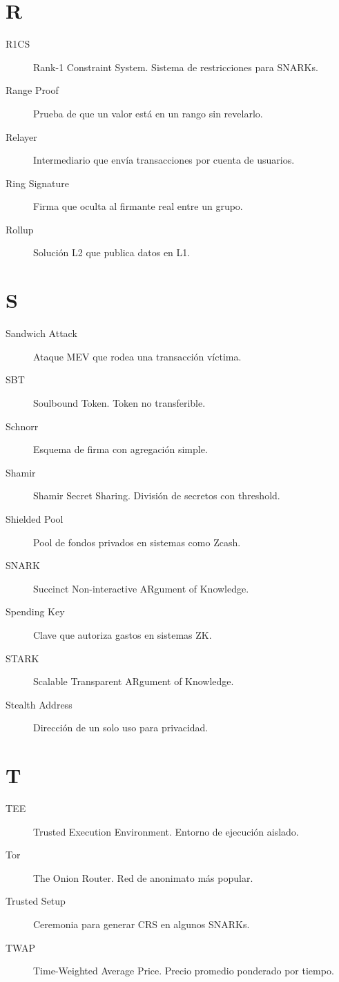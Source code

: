 \documentclass[11pt,a4paper,twoside]{book}
\theoremstyle{definition}
\theoremstyle{remark}
\begin{document}
\section*{R}
\begin{description}
\item[R1CS] Rank-1 Constraint System. Sistema de restricciones para SNARKs.
\item[Range Proof] Prueba de que un valor está en un rango sin revelarlo.
\item[Relayer] Intermediario que envía transacciones por cuenta de usuarios.
\item[Ring Signature] Firma que oculta al firmante real entre un grupo.
\item[Rollup] Solución L2 que publica datos en L1.
\end{description}

\section*{S}
\begin{description}
\item[Sandwich Attack] Ataque MEV que rodea una transacción víctima.
\item[SBT] Soulbound Token. Token no transferible.
\item[Schnorr] Esquema de firma con agregación simple.
\item[Shamir] Shamir Secret Sharing. División de secretos con threshold.
\item[Shielded Pool] Pool de fondos privados en sistemas como Zcash.
\item[SNARK] Succinct Non-interactive ARgument of Knowledge.
\item[Spending Key] Clave que autoriza gastos en sistemas ZK.
\item[STARK] Scalable Transparent ARgument of Knowledge.
\item[Stealth Address] Dirección de un solo uso para privacidad.
\end{description}

\section*{T}
\begin{description}
\item[TEE] Trusted Execution Environment. Entorno de ejecución aislado.
\item[Tor] The Onion Router. Red de anonimato más popular.
\item[Trusted Setup] Ceremonia para generar CRS en algunos SNARKs.
\item[TWAP] Time-Weighted Average Price. Precio promedio ponderado por tiempo.
\end{description}
\end{document}
